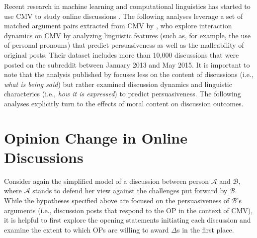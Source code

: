 Recent research in machine learning and computational linguistics has started to use CMV to study online discussions \citep{wei2016post,hidey2017analyzing}. The following analyses leverage a set of matched argument pairs extracted from CMV by \citet{tan2016winning}, who explore interaction dynamics on CMV by analyzing linguistic features (such as, for example, the use of personal pronouns) that predict persuasiveness as well as the malleability of original posts. Their dataset includes more than 10,000 discussions that were posted on the subreddit between January 2013 and May 2015. It is important to note that the analysis published by \citet{tan2016winning} focuses less on the content of discussions (i.e., \textit{what is being said}) but rather examined discussion dynamics and linguistic characterics (i.e., \textit{how it is expressed}) to predict persuasiveness. The following analyses explicitly turn to the effects of moral content on discussion outcomes.




\section{Opinion Change in Online Discussions}

Consider again the simplified model of a discussion between person $\mathcal{A}$ and $\mathcal{B}$, where $\mathcal{A}$ stands to defend her view against the challenges put forward by $\mathcal{B}$. While the hypotheses specified above are focused on the persuasiveness of $\mathcal{B}$'s arguments (i.e., discussion posts that respond to the OP in the context of CMV), it is helpful to first explore the opening statements initiating each discussion and examine the extent to which OPs are willing to award $\Delta$s in the first place.

